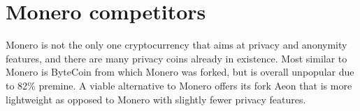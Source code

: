 \documentclass[
  printed, %
  table,   %
  nolof,     %
  nolot,     %
           oneside, color
]{fithesis3}
\begin{document}
\section{Monero competitors}
\label{sec:monero-timeline}
Monero is not the only one cryptocurrency that aims at privacy and anonymity features, and there are many privacy coins already in existence. Most similar to Monero is ByteCoin from which Monero was forked, but is overall unpopular due to 82\% premine.  A viable alternative to Monero offers its fork Aeon that is more lightweight as opposed to Monero with slightly fewer privacy features.

\end{document}
